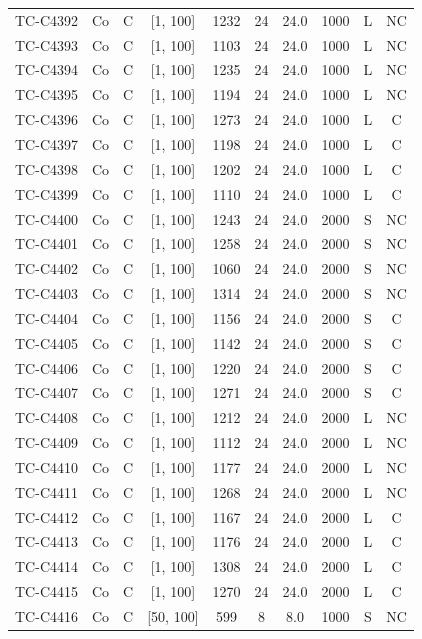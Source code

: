 \begin{longtable}{lccccccccc}
TC-C4392 & Co & C & [1, 100] & 1232 & 24 & 24.0 & 1000 & L & NC \\
TC-C4393 & Co & C & [1, 100] & 1103 & 24 & 24.0 & 1000 & L & NC \\
TC-C4394 & Co & C & [1, 100] & 1235 & 24 & 24.0 & 1000 & L & NC \\
TC-C4395 & Co & C & [1, 100] & 1194 & 24 & 24.0 & 1000 & L & NC \\
TC-C4396 & Co & C & [1, 100] & 1273 & 24 & 24.0 & 1000 & L & C \\
TC-C4397 & Co & C & [1, 100] & 1198 & 24 & 24.0 & 1000 & L & C \\
TC-C4398 & Co & C & [1, 100] & 1202 & 24 & 24.0 & 1000 & L & C \\
TC-C4399 & Co & C & [1, 100] & 1110 & 24 & 24.0 & 1000 & L & C \\
TC-C4400 & Co & C & [1, 100] & 1243 & 24 & 24.0 & 2000 & S & NC \\
TC-C4401 & Co & C & [1, 100] & 1258 & 24 & 24.0 & 2000 & S & NC \\
TC-C4402 & Co & C & [1, 100] & 1060 & 24 & 24.0 & 2000 & S & NC \\
TC-C4403 & Co & C & [1, 100] & 1314 & 24 & 24.0 & 2000 & S & NC \\
TC-C4404 & Co & C & [1, 100] & 1156 & 24 & 24.0 & 2000 & S & C \\
TC-C4405 & Co & C & [1, 100] & 1142 & 24 & 24.0 & 2000 & S & C \\
TC-C4406 & Co & C & [1, 100] & 1220 & 24 & 24.0 & 2000 & S & C \\
TC-C4407 & Co & C & [1, 100] & 1271 & 24 & 24.0 & 2000 & S & C \\
TC-C4408 & Co & C & [1, 100] & 1212 & 24 & 24.0 & 2000 & L & NC \\
TC-C4409 & Co & C & [1, 100] & 1112 & 24 & 24.0 & 2000 & L & NC \\
TC-C4410 & Co & C & [1, 100] & 1177 & 24 & 24.0 & 2000 & L & NC \\
TC-C4411 & Co & C & [1, 100] & 1268 & 24 & 24.0 & 2000 & L & NC \\
TC-C4412 & Co & C & [1, 100] & 1167 & 24 & 24.0 & 2000 & L & C \\
TC-C4413 & Co & C & [1, 100] & 1176 & 24 & 24.0 & 2000 & L & C \\
TC-C4414 & Co & C & [1, 100] & 1308 & 24 & 24.0 & 2000 & L & C \\
TC-C4415 & Co & C & [1, 100] & 1270 & 24 & 24.0 & 2000 & L & C \\
TC-C4416 & Co & C & [50, 100] & 599 & 8 & 8.0 & 1000 & S & NC \\

\end{longtable}
